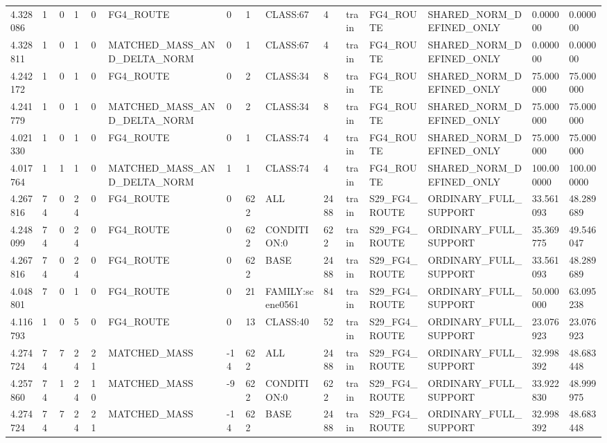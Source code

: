 \begin{tabular}{lllllllllllllll}
4.328086 & 1 & 0 & 1 & 0 & FG4\_ROUTE & 0 & 1 & CLASS:67 & 4 & train & FG4\_ROUTE & SHARED\_NORM\_DEFINED\_ONLY & 0.000000 & 0.000000 \\
4.328811 & 1 & 0 & 1 & 0 & MATCHED\_MASS\_AND\_DELTA\_NORM & 0 & 1 & CLASS:67 & 4 & train & FG4\_ROUTE & SHARED\_NORM\_DEFINED\_ONLY & 0.000000 & 0.000000 \\
4.242172 & 1 & 0 & 1 & 0 & FG4\_ROUTE & 0 & 2 & CLASS:34 & 8 & train & FG4\_ROUTE & SHARED\_NORM\_DEFINED\_ONLY & 75.000000 & 75.000000 \\
4.241779 & 1 & 0 & 1 & 0 & MATCHED\_MASS\_AND\_DELTA\_NORM & 0 & 2 & CLASS:34 & 8 & train & FG4\_ROUTE & SHARED\_NORM\_DEFINED\_ONLY & 75.000000 & 75.000000 \\
4.021330 & 1 & 0 & 1 & 0 & FG4\_ROUTE & 0 & 1 & CLASS:74 & 4 & train & FG4\_ROUTE & SHARED\_NORM\_DEFINED\_ONLY & 75.000000 & 75.000000 \\
4.017764 & 1 & 1 & 1 & 0 & MATCHED\_MASS\_AND\_DELTA\_NORM & 1 & 1 & CLASS:74 & 4 & train & FG4\_ROUTE & SHARED\_NORM\_DEFINED\_ONLY & 100.000000 & 100.000000 \\
4.267816 & 74 & 0 & 24 & 0 & FG4\_ROUTE & 0 & 622 & ALL & 2488 & train & S29\_FG4\_ROUTE & ORDINARY\_FULL\_SUPPORT & 33.561093 & 48.289689 \\
4.248099 & 74 & 0 & 24 & 0 & FG4\_ROUTE & 0 & 622 & CONDITION:0 & 622 & train & S29\_FG4\_ROUTE & ORDINARY\_FULL\_SUPPORT & 35.369775 & 49.546047 \\
4.267816 & 74 & 0 & 24 & 0 & FG4\_ROUTE & 0 & 622 & BASE & 2488 & train & S29\_FG4\_ROUTE & ORDINARY\_FULL\_SUPPORT & 33.561093 & 48.289689 \\
4.048801 & 7 & 0 & 1 & 0 & FG4\_ROUTE & 0 & 21 & FAMILY:scene0561 & 84 & train & S29\_FG4\_ROUTE & ORDINARY\_FULL\_SUPPORT & 50.000000 & 63.095238 \\
4.116793 & 1 & 0 & 5 & 0 & FG4\_ROUTE & 0 & 13 & CLASS:40 & 52 & train & S29\_FG4\_ROUTE & ORDINARY\_FULL\_SUPPORT & 23.076923 & 23.076923 \\
4.274724 & 74 & 7 & 24 & 21 & MATCHED\_MASS & -14 & 622 & ALL & 2488 & train & S29\_FG4\_ROUTE & ORDINARY\_FULL\_SUPPORT & 32.998392 & 48.683448 \\
4.257860 & 74 & 1 & 24 & 10 & MATCHED\_MASS & -9 & 622 & CONDITION:0 & 622 & train & S29\_FG4\_ROUTE & ORDINARY\_FULL\_SUPPORT & 33.922830 & 48.999975 \\
4.274724 & 74 & 7 & 24 & 21 & MATCHED\_MASS & -14 & 622 & BASE & 2488 & train & S29\_FG4\_ROUTE & ORDINARY\_FULL\_SUPPORT & 32.998392 & 48.683448 \\

\end{tabular}
